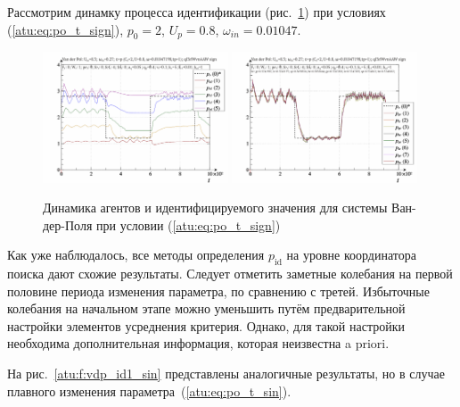 Рассмотрим динамку процесса идентификации
(рис.~\ref{atu:f:vdp_id1_sign})
при условиях (\ref{atu:eq:po_t_sign}), $p_0=2$, $U_p=0.8$, $\omega_{in}=0.01047$.

\begin{figure}[ht!]
\begin{center}
  \includegraphics[width=0.49\textwidth]{p/cha/vdp/vdp_id-p_t_pi_ql3rlWvnAAW_sign.png}
  \hfill
  \includegraphics[width=0.49\textwidth]{p/cha/vdp/vdp_id-p_t_p_ql3rlWvnAAW_sign.png}
\end{center}
  \caption{Динамика агентов и идентифицируемого значения для системы Ван-дер-Поля при условии (\ref{atu:eq:po_t_sign})}
\label{atu:f:vdp_id1_sign}
\end{figure}

Как уже наблюдалось, все методы определения $p_\mathrm{id}$
на уровне координатора поиска дают схожие результаты.
Следует отметить заметные колебания на первой половине периода изменения
параметра, по сравнению с третей. Избыточные колебания на начальном этапе можно
уменьшить путём предварительной настройки элементов усреднения критерия.
Однако, для такой настройки необходима дополнительная информация,
которая неизвестна a priori.

На рис.~\ref{atu:f:vdp_id1_sin}
представлены аналогичные результаты,
но в случае плавного изменения параметра~(\ref{atu:eq:po_t_sin}).

